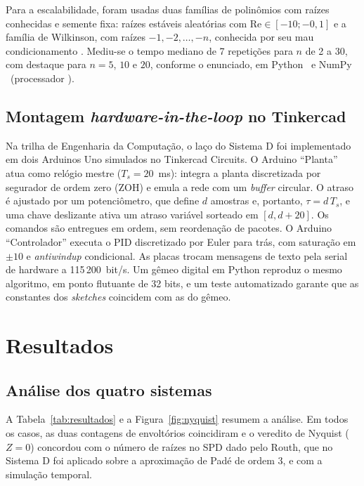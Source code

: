 \documentclass[12pt]{article}
\begin{document}
Para a escalabilidade, foram usadas duas famílias de polinômios com raízes conhecidas e semente fixa: raízes estáveis aleatórias com $\mathrm{Re}\in[-10;-0{,}1]$ e a família de Wilkinson, com raízes $-1,-2,\dots,-n$, conhecida por seu mau condicionamento \cite{wilkinson1984}. Mediu-se o tempo mediano de 7 repetições para $n$ de 2 a 30, com destaque para $n=5$, $10$ e $20$, conforme o enunciado, em Python \VerPython\ e NumPy \VerNumpy\ (processador \CPU).

\subsection{Montagem \textit{hardware-in-the-loop} no Tinkercad}
\label{sec:met-hil}

Na trilha de Engenharia da Computação, o laço do Sistema D foi implementado em dois Arduinos Uno simulados no Tinkercad Circuits. O Arduino ``Planta'' atua como relógio mestre ($T_s=20$~ms): integra a planta discretizada por segurador de ordem zero (ZOH) e emula a rede com um \textit{buffer} circular. O atraso é ajustado por um potenciômetro, que define $d$ amostras e, portanto, $\tau=d\,T_s$, e uma chave deslizante ativa um atraso variável sorteado em $[d,d+20]$. Os comandos são entregues em ordem, sem reordenação de pacotes. O Arduino ``Controlador'' executa o PID discretizado por Euler para trás, com saturação em $\pm 10$ e \textit{antiwindup} condicional. As placas trocam mensagens de texto pela serial de hardware a 115\,200~bit/s. Um gêmeo digital em Python reproduz o mesmo algoritmo, em ponto flutuante de 32 bits, e um teste automatizado garante que as constantes dos \textit{sketches} coincidem com as do gêmeo.

\section{Resultados}

\subsection{Análise dos quatro sistemas}
\label{sec:res-sistemas}

A Tabela~\ref{tab:resultados} e a Figura~\ref{fig:nyquist} resumem a análise. Em todos os casos, as duas contagens de envoltórios coincidiram e o veredito de Nyquist ($Z=0$) concordou com o número de raízes no SPD dado pelo Routh, que no Sistema D foi aplicado sobre a aproximação de Padé de ordem 3, e com a simulação temporal.
\end{document}
